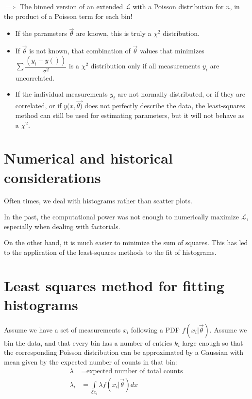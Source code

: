 $\implies$ The binned version of an extended $\mathcal{L}$ with a Poisson distribution for $n$, in the product of a Poisson term for each bin! 

\begin{itemize}[$\to$]
    \item If the parameters $\vec{\theta}$ are known, this is truly a $\chi^2$ distribution.
    \item If $\vec{\theta}$ is not known, that combination of $\vec{\theta}$ values that minimizes $\sum \dfrac{(y_i - y())}{\sigma^2}$  is a $\chi^2$ distribution only if all measurements $y_i$ are uncorrelated. 
    \item If the individual measurements $y_i$ are not normally distributed, or if they are correlated, or if $y(x,\vec{\theta)}$ does not perfectly describe the data, the least-squares method can still be used for estimating parameters, but it will not behave as a $\chi^2$. 
\end{itemize}

\section{Numerical and historical considerations}
\label{sec:numerical_and_historical_considerations}
Often times, we deal with histograms rather than scatter plots. 

In the past, the computational power was not enough to numerically maximize $\mathcal{L}$, especially when dealing with factorials. 

On the other hand, it is much easier to minimize the sum of squares. This has led to the application of the least-squares methods to the fit of histograms.

\section{Least squares method for fitting histograms} \label{sec:least_squares_fitting_histograms}
Assume we have a set of measurements $x_i$ following a PDF $f(x_i|\vec{\theta})$. Assume we bin the data, and that every bin has a number of entries $k_i$ large enough so that the corresponding Poisson distribution can be approximated by a Gaussian with mean given by the expected number of counts in that bin:
\begin{align}
    \lambda &= \text{expected number of total counts}\\
    \lambda_i &= \int \limits_{\delta x_i} \lambda f(x_i|\vec{\theta}) dx
\end{align}

